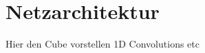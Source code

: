 \section{Netzarchitektur}
\label{raeumliche_netzarchitektur}

Hier den Cube vorstellen
1D Convolutions etc



